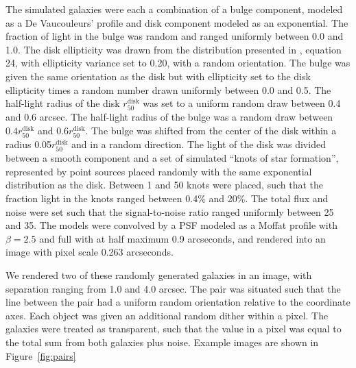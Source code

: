 \documentclass[iop, twocolappendix, appendixfloats, numberedappendix, apj]{hackemulateapj}
\begin{document}
The simulated galaxies were each a combination of a bulge component, modeled as
a De Vaucouleurs' profile \citep{devauc1948} and disk component modeled as an
exponential. The fraction of light in the bulge was random and ranged uniformly
between 0.0 and 1.0. The disk ellipticity was drawn from the distribution
presented in \cite{ba14}, equation 24, with ellipticity variance set to 0.20,
with a random orientation. The bulge was given the same orientation as the disk
but with ellipticity set to the disk ellipticity times a random number drawn
uniformly between 0.0 and 0.5. The half-light radius of the disk
$r_{50}^{\mathrm{disk}}$ was set to a uniform random draw between 0.4 and 0.6
arcsec. The half-light radius of the bulge was a random draw between $0.4
r_{50}^{\mathrm{disk}}$ and $0.6 r_{50}^{\mathrm{disk}}$. The bulge was shifted
from the center of the disk within a radius 0.05$r_{50}^{\mathrm{disk}}$ and in
a random direction. The light of the disk was divided between a smooth
component and a set of simulated ``knots of star formation'', represented by
point sources placed randomly with the same exponential distribution as the
disk.  Between 1 and 50 knots were placed, such that the fraction light in the
knots ranged between 0.4\% and 20\%. The total flux and noise were set such
that the signal-to-noise ratio ranged uniformly between 25 and 35.  The models
were convolved by a PSF modeled as a Moffat \citep{Moffat1969} profile with
$\beta=2.5$ and full with at half maximum 0.9 arcseconds, and rendered into an
image with pixel scale 0.263 arcseconds.

We rendered two of these randomly generated galaxies in an image, with
separation ranging from 1.0 and 4.0 arcsec. The pair was situated such that the
line between the pair had a uniform random orientation relative to the
coordinate axes. Each object was given an additional random dither within a
pixel. The galaxies were treated as transparent, such that the value in a pixel
was equal to the total sum from both galaxies plus noise. Example images are
shown in Figure~\ref{fig:pairs}
\end{document}
